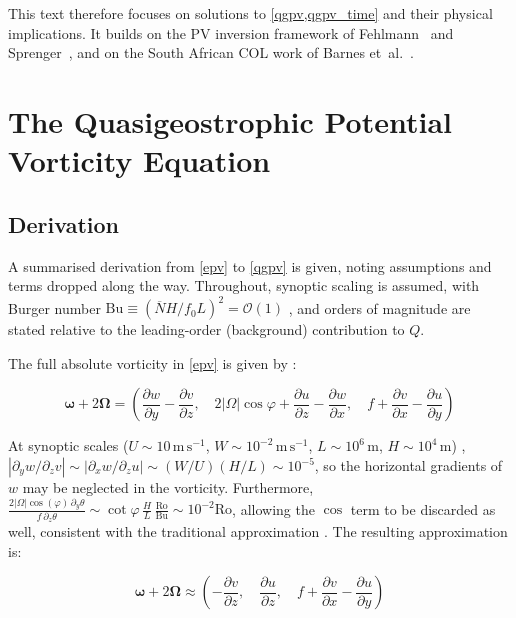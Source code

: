 \documentclass{article}
\begin{document}
This text therefore focuses on solutions to \cref{qgpv,qgpv_time} and their physical implications.
It builds on the PV inversion framework of Fehlmann~\cite{fehlmann1997pvelements} and Sprenger~\cite{sprenger2007userguide},
and on the South African COL work of Barnes et~al.~\cite{Barnes2022main}.

\section{The Quasigeostrophic Potential Vorticity Equation}

\subsection{Derivation}

A summarised derivation from \cref{epv} to \cref{qgpv} is given, noting assumptions and terms dropped along the way.
Throughout, synoptic scaling is assumed, with Burger number $\mathrm{Bu} \equiv \left(\overline N H / f_0 L\right)^2 = \mathcal{O}(1)$ \cite{Vallis2017}, and orders of magnitude are stated relative to the leading-order (background) contribution to $Q$.

The full absolute vorticity in \cref{epv} is given by \cite{HOLTON_chapter2}:

\begin{equation}
    \bm{\omega} + 2 \bm{\Omega} = \left(\frac{\partial w}{\partial y}-\frac{\partial v}{\partial z}, \quad 2 |\Omega|\cos\varphi+\frac{\partial u}{\partial z}-\frac{\partial w}{\partial x}, \quad f + \frac{\partial v}{\partial x}-\frac{\partial u}{\partial y} \right)
\end{equation}

At synoptic scales ($U \sim 10\,\mathrm{m\,s^{-1}}$, $W \sim 10^{-2}\,\mathrm{m\,s^{-1}}$, $L \sim 10^{6}\,\mathrm{m}$, $H \sim 10^{4}\,\mathrm{m}$) \cite{HOLTON_chapter2}, $|\partial_y w / \partial_z v | \sim |\partial_x w / \partial_z u | \sim (W/U)(H/L) \sim 10^{-5}$, so the horizontal gradients of $w$ may be neglected in the vorticity.
Furthermore, $\frac{2 |\Omega|\cos(\varphi)\, \partial_y \theta}{f\, \partial_z \theta} \sim \cot\varphi \, \frac{H}{L} \, \frac{\mathrm{Ro}}{\mathrm{Bu}} \sim 10^{-2} \mathrm{Ro}$, allowing the $\cos$ term to be discarded as well, consistent with the traditional approximation \cite{HOLTON_chapter2,Vallis2017}.
The resulting approximation is:

\begin{equation}
    \bm{\omega} + 2 \bm{\Omega} \approx \left(-\frac{\partial v}{\partial z}, \quad \frac{\partial u}{\partial z}, \quad f + \frac{\partial v}{\partial x}-\frac{\partial u}{\partial y} \right)
\end{equation}
\end{document}
